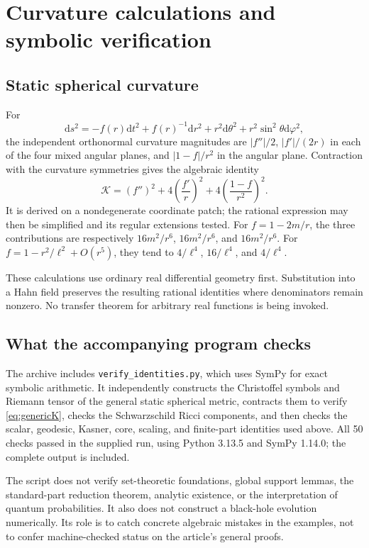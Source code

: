 \documentclass[11pt,a4paper]{article}
\numberwithin{equation}{section}
\theoremstyle{definition}
\theoremstyle{remark}
\newcommand{\dd}{\mathrm d}
\newcommand{\Krets}{\mathcal K}
\begin{document}
\appendix
\section{Curvature calculations and symbolic verification}
\label{app:curvature}

\subsection{Static spherical curvature}
For
\begin{equation}
 \dd s^2=-f(r)\dd t^2+f(r)^{-1}\dd r^2
 +r^2\dd\theta^2+r^2\sin^2\theta\dd\varphi^2,
\end{equation}
the independent orthonormal curvature magnitudes are $|f''|/2$, $|f'|/(2r)$ in each of the four mixed angular planes, and $|1-f|/r^2$ in the angular plane. Contraction with the curvature symmetries gives the algebraic identity
\begin{equation}\label{eq:genericK}
 \Krets=(f'')^2+4\left(\frac{f'}r\right)^2
 +4\left(\frac{1-f}{r^2}\right)^2.
\end{equation}
It is derived on a nondegenerate coordinate patch; the rational expression may then be simplified and its regular extensions tested. For $f=1-2m/r$, the three contributions are respectively $16m^2/r^6$, $16m^2/r^6$, and $16m^2/r^6$. For $f=1-r^2/\ell^2+O(r^5)$, they tend to $4/\ell^4$, $16/\ell^4$, and $4/\ell^4$.

These calculations use ordinary real differential geometry first. Substitution into a Hahn field preserves the resulting rational identities where denominators remain nonzero. No transfer theorem for arbitrary real functions is being invoked.

\subsection{What the accompanying program checks}
The archive includes \texttt{verify\_identities.py}, which uses SymPy for exact symbolic arithmetic. It independently constructs the Christoffel symbols and Riemann tensor of the general static spherical metric, contracts them to verify \eqref{eq:genericK}, checks the Schwarzschild Ricci components, and then checks the scalar, geodesic, Kasner, core, scaling, and finite-part identities used above. All 50 checks passed in the supplied run, using Python 3.13.5 and SymPy 1.14.0; the complete output is included.

The script does not verify set-theoretic foundations, global support lemmas, the standard-part reduction theorem, analytic existence, or the interpretation of quantum probabilities. It also does not construct a black-hole evolution numerically. Its role is to catch concrete algebraic mistakes in the examples, not to confer machine-checked status on the article's general proofs.
\end{document}
